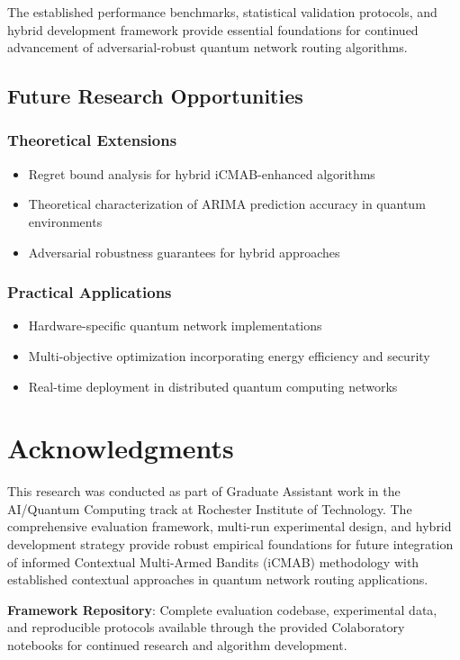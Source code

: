 \documentclass[12pt,a4paper]{article}
\begin{document}
The established performance benchmarks, statistical validation protocols, and hybrid development framework provide essential foundations for continued advancement of adversarial-robust quantum network routing algorithms.

\subsection{Future Research Opportunities}

\subsubsection{Theoretical Extensions}
\begin{itemize}
\item Regret bound analysis for hybrid iCMAB-enhanced algorithms
\item Theoretical characterization of ARIMA prediction accuracy in quantum environments
\item Adversarial robustness guarantees for hybrid approaches
\end{itemize}

\subsubsection{Practical Applications}
\begin{itemize}
\item Hardware-specific quantum network implementations
\item Multi-objective optimization incorporating energy efficiency and security
\item Real-time deployment in distributed quantum computing networks
\end{itemize}

\section{Acknowledgments}

This research was conducted as part of Graduate Assistant work in the AI/Quantum Computing track at Rochester Institute of Technology. The comprehensive evaluation framework, multi-run experimental design, and hybrid development strategy provide robust empirical foundations for future integration of informed Contextual Multi-Armed Bandits (iCMAB) methodology with established contextual approaches in quantum network routing applications.

\textbf{Framework Repository}: Complete evaluation codebase, experimental data, and reproducible protocols available through the provided Colaboratory notebooks for continued research and algorithm development.
\end{document}
